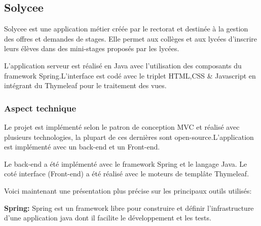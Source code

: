 \documentclass[12pt]{article}
\begin{document}
\subsection{Solycee}

Solycee est une application métier créée par le rectorat et destinée à la gestion des offres et demandes de stages. Elle permet aux collèges et aux lycées d'inscrire leurs élèves dans des mini-stages proposés par les lycées.  

L'application serveur est réalisé en Java avec l'utilisation des composants du framework Spring.L'interface est codé avec le triplet HTML,CSS \& Javascript en intégrant du Thymeleaf pour le traitement des vues.  

\subsubsection{Aspect technique}

Le projet est implémenté selon le patron de conception MVC et réalisé avec plusieurs technologies, la plupart de ces dernières sont open-source.L'application est implémenté avec un back-end et un Front-end.

Le back-end a été implémenté avec le framework Spring et le langage Java. Le coté interface (Front-end) a été réalisé avec le moteurs de templâte Thymeleaf. 

Voici maintenant une présentation plus précise sur les principaux outils utilisés:\newline

\textbf{Spring:}  Spring est un framework libre pour construire et définir l'infrastructure d'une application java dont il facilite le développement et les tests.\newline
\end{document}
